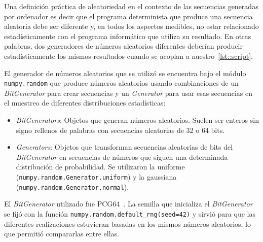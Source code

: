 Una definición práctica de aleatoriedad en el contexto de las secuencias generadas por ordenador es decir que el programa determinista que produce una secuencia aleatoria debe ser diferente y, en todos los aspectos medibles, no estar relacionado estadísticamente con el programa informático que utiliza su resultado. En otras palabras, dos generadores de números aleatorios diferentes deberían producir estadísticamente los mismos resultados cuando se acoplan a nuestro~\autoref{lst::script}.

El generador de números aleatorios que se utilizó se encuentra bajo el módulo \texttt{numpy.random} que produce números aleatorios usando combinaciones de un \textit{BitGenerator} para crear secuencias y un \textit{Generator} para usar esas secuencias en el muestreo de diferentes distribuciones estadísticas:
\begin{itemize}
    \item \textit{BitGenerators}: Objetos que generan números aleatorios. Suelen ser enteros sin signo rellenos de palabras con secuencias aleatorias de 32 o 64 bits.
\end{itemize}
\newpage
\begin{itemize}
    \item \textit{Generators}: Objetos que transforman secuencias aleatorias de bits del \textit{BitGenerator} en secuencias de números que siguen una determinada distribución de probabilidad. Se utilizaron la uniforme (\texttt{numpy.random.Generator.uniform}) y la gaussiana (\texttt{numpy.random.Generator.normal}).
\end{itemize}

El \textit{BitGenerator} utilizado fue PCG64~\cite{o2014pcg}. La semilla que inicializa el \textit{BitGenerator} se fijó con la función \texttt{numpy.random.default\_rng(seed=42)} y sirvió para que las diferentes realizaciones estuvieran basadas en los mismos números aleatorios, lo que permitió compararlas entre ellas.
